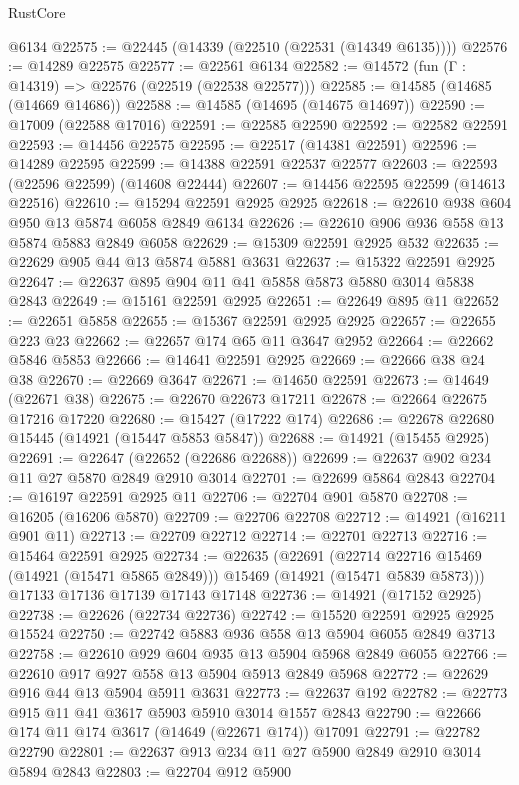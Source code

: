 \begin{lexlean}{RustCore}
\begin{coremodule}
    @6134
@22575 := @22445 (@14339 (@22510 (@22531 (@14349 @6135))))
@22576 := @14289 @22575
@22577 := @22561 @6134
@22582 := @14572 (fun (Γ : @14319) => @22576 (@22519 (@22538 @22577)))
@22585 := @14585 (@14685 (@14669 @14686))
@22588 := @14585 (@14695 (@14675 @14697))
@22590 := @17009 (@22588 @17016)
@22591 := @22585 @22590
@22592 := @22582 @22591
@22593 := @14456 @22575
@22595 := @22517 (@14381 @22591)
@22596 := @14289 @22595
@22599 := @14388 @22591 @22537 @22577
@22603 := @22593 (@22596 @22599) (@14608 @22444)
@22607 := @14456 @22595 @22599 (@14613 @22516)
@22610 := @15294 @22591 @2925 @2925
@22618 := @22610 @938 @604 @950 @13 @5874 @6058 @2849 @6134
@22626 := @22610 @906 @936 @558 @13 @5874 @5883 @2849 @6058
@22629 := @15309 @22591 @2925 @532
@22635 := @22629 @905 @44 @13 @5874 @5881 @3631
@22637 := @15322 @22591 @2925
@22647 := @22637 @895 @904 @11 @41 @5858 @5873 @5880 @3014 @5838 @2843
@22649 := @15161 @22591 @2925
@22651 := @22649 @895 @11
@22652 := @22651 @5858
@22655 := @15367 @22591 @2925 @2925
@22657 := @22655 @223 @23
@22662 := @22657 @174 @65 @11 @3647 @2952
@22664 := @22662 @5846 @5853
@22666 := @14641 @22591 @2925
@22669 := @22666 @38 @24 @38
@22670 := @22669 @3647
@22671 := @14650 @22591
@22673 := @14649 (@22671 @38)
@22675 := @22670 @22673 @17211
@22678 := @22664 @22675 @17216 @17220
@22680 := @15427 (@17222 @174)
@22686 := @22678 @22680 @15445 (@14921 (@15447 @5853 @5847))
@22688 := @14921 (@15455 @2925)
@22691 := @22647 (@22652 (@22686 @22688))
@22699 := @22637 @902 @234 @11 @27 @5870 @2849 @2910 @3014
@22701 := @22699 @5864 @2843
@22704 := @16197 @22591 @2925 @11
@22706 := @22704 @901 @5870
@22708 := @16205 (@16206 @5870)
@22709 := @22706 @22708
@22712 := @14921 (@16211 @901 @11)
@22713 := @22709 @22712
@22714 := @22701 @22713
@22716 := @15464 @22591 @2925
@22734 := @22635
    (@22691
      (@22714 @22716 @15469 (@14921 (@15471 @5865 @2849)))
      @15469
      (@14921 (@15471 @5839 @5873)))
    @17133
    @17136
    @17139
    @17143
    @17148
@22736 := @14921 (@17152 @2925)
@22738 := @22626 (@22734 @22736)
@22742 := @15520 @22591 @2925 @2925 @15524
@22750 := @22742 @5883 @936 @558 @13 @5904 @6055 @2849 @3713
@22758 := @22610 @929 @604 @935 @13 @5904 @5968 @2849 @6055
@22766 := @22610 @917 @927 @558 @13 @5904 @5913 @2849 @5968
@22772 := @22629 @916 @44 @13 @5904 @5911 @3631
@22773 := @22637 @192
@22782 := @22773 @915 @11 @41 @3617 @5903 @5910 @3014 @1557 @2843
@22790 := @22666 @174 @11 @174 @3617 (@14649 (@22671 @174)) @17091
@22791 := @22782 @22790
@22801 := @22637 @913 @234 @11 @27 @5900 @2849 @2910 @3014 @5894 @2843
@22803 := @22704 @912 @5900

\end{coremodule}
\end{lexlean}
